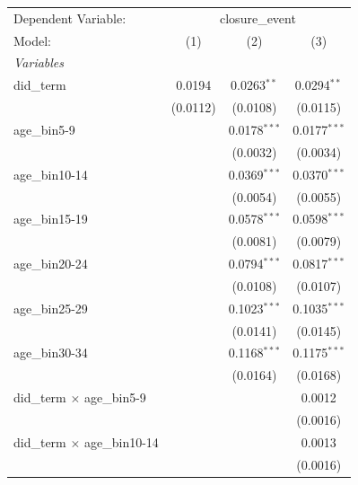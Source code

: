 
\begingroup
\centering
\begin{tabular}{lccc}
   \tabularnewline \midrule \midrule
   Dependent Variable: & \multicolumn{3}{c}{closure\_event}\\
   Model:                              & (1)      & (2)            & (3)\\  
   \midrule
   \emph{Variables}\\
   did\_term                           & 0.0194   & 0.0263$^{**}$  & 0.0294$^{**}$\\   
                                       & (0.0112) & (0.0108)       & (0.0115)\\   
   age\_bin5-9                         &          & 0.0178$^{***}$ & 0.0177$^{***}$\\   
                                       &          & (0.0032)       & (0.0034)\\   
   age\_bin10-14                       &          & 0.0369$^{***}$ & 0.0370$^{***}$\\   
                                       &          & (0.0054)       & (0.0055)\\   
   age\_bin15-19                       &          & 0.0578$^{***}$ & 0.0598$^{***}$\\   
                                       &          & (0.0081)       & (0.0079)\\   
   age\_bin20-24                       &          & 0.0794$^{***}$ & 0.0817$^{***}$\\   
                                       &          & (0.0108)       & (0.0107)\\   
   age\_bin25-29                       &          & 0.1023$^{***}$ & 0.1035$^{***}$\\   
                                       &          & (0.0141)       & (0.0145)\\   
   age\_bin30-34                       &          & 0.1168$^{***}$ & 0.1175$^{***}$\\   
                                       &          & (0.0164)       & (0.0168)\\   
   did\_term $\times$ age\_bin5-9      &          &                & 0.0012\\   
                                       &          &                & (0.0016)\\   
   did\_term $\times$ age\_bin10-14    &          &                & 0.0013\\   
                                       &          &                & (0.0016)\\   

\end{tabular}
